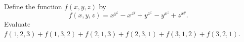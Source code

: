 Define the function $f(x, y, z)$ by\[f(x, y, z) = x^{y^z} - x^{z^y} + y^{z^x} - y^{x^z} + z^{x^y}.\]Evaluate $f(1, 2, 3) + f(1, 3, 2) + f(2, 1, 3) + f(2, 3, 1) + f(3, 1, 2) + f(3, 2, 1)$.
